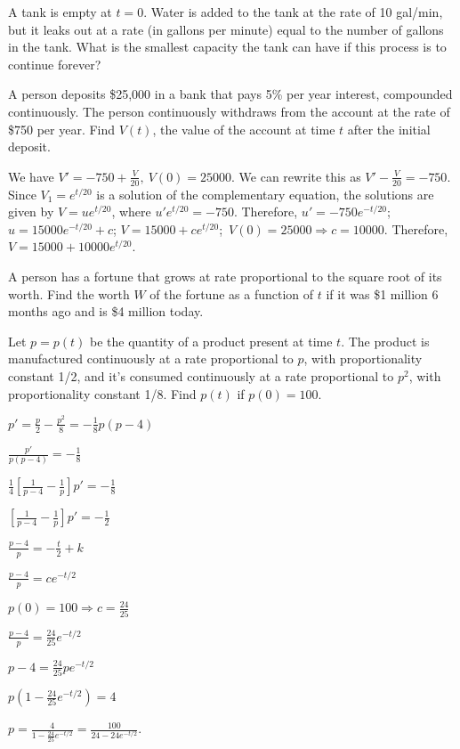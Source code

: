 \documentclass{ximera}
\begin{document}
\begin{problem}\label{exer:4.1.17}
A tank is empty at $t=0$.  Water is added to the tank at
the rate of 10 gal/min, but it leaks out at a rate
 (in gallons per minute)  equal to the number of
gallons in the tank.  What is the smallest capacity the tank
can have if this process is to continue forever?
\end{problem}

\begin{problem}\label{exer:4.1.18}
A person deposits \$25,000 in a bank that pays 5\% per
year interest, compounded continuously.  The person
continuously withdraws from the account at the rate of \$750
per year.  Find $V(t)$, the value of the account at time $t$
after the initial deposit.
\begin{solution}
We have $V'=-750+\frac{V}{20},\ V(0)=25000$. We can rewrite this as $V'-\frac{V}{20}=-750$. Since
$V_1=e^{t/20}$ is a solution of the complementary equation, the
solutions are given by $V=ue^{t/20}$, where $u'e^{t/20}=-750$.
Therefore, $u'=-750e^{-t/20}$;\ $u=15000e^{-t/20}+c$;\;
$V=15000+ce^{t/20}$;\ $V(0)=25000\Rightarrow c=10000$. Therefore,
$V=15000+10000e^{t/20}$.
\end{solution}
\end{problem}

\begin{problem}\label{exer:4.1.19}
  A person has a fortune that grows at rate proportional to the
square root of its worth. Find the  worth $W$ of the fortune as a function
of $t$ if it was  \$1 million 6 months ago and
is \$4 million today.
\end{problem}

\begin{problem}\label{exer:4.1.20}
Let $p=p(t)$ be the quantity of a  product present at
time $t$. The product is manufactured continuously at a
rate proportional to $p$, with proportionality constant 1/2,
and it's consumed continuously at a rate proportional to
$p^2$, with proportionality constant 1/8.  Find $p(t)$ if
$p(0)=100$.

\begin{solution}
$p'=\frac{p}{2}-\frac{p^2}{8}=-\frac{1}{8}p(p-4)$ 

$\frac{p'}{p(p-4)}=-\frac{1}{8}$ 

$\frac{1}{4}\left[
\frac{1}{p-4}-\frac{1}{p}\right]p'=-\frac{1}{8}$ 

 $\left[
\frac{1}{p-4}-\frac{1}{p}\right]p'=-\frac{1}{2}$ 

$\frac{p-4}{p}=-\frac{t}{2}+k$ 

$\frac{p-4}{p}=ce^{-t/2}$

$p(0)=100 \Rightarrow c=\frac{24}{25}$ 

$\frac{p-4}{p}=\frac{24}{25}e^{-t/2}$ 

$p-4=\frac{24}{25}pe^{-t/2}$ 

$p\left(1-\frac{24}{25} e^{-t/2}\right)=4$ 

$p=\frac{4}{1-\frac{24}{25}e^{-t/2}}=\frac{100}{24-24e^{-t/2}}$.
\end{solution}
\end{problem}
\end{document}
